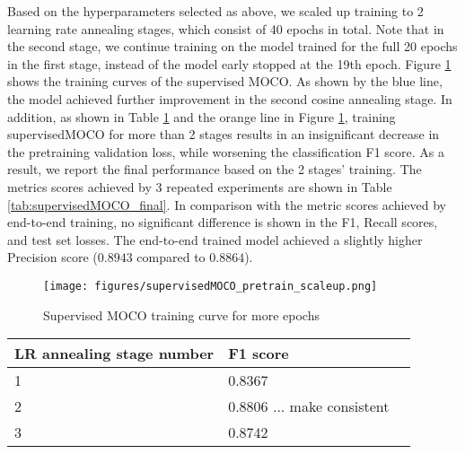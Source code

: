 \documentclass[12pt,twoside]{report}
\begin{document}
Based on the hyperparameters selected as above, we scaled up training to 2 learning rate annealing stages, which consist of 40 epochs in total. Note that in the second stage, we continue training on the model trained for the full 20 epochs in the first stage, instead of the model early stopped at the 19th epoch. Figure \ref{fig:supervisedMOCO_pretraining_final_curve} shows the training curves of the supervised MOCO. As shown by the blue line, the model achieved further improvement in the second cosine annealing stage. In addition, as shown in Table \ref{tab:supervisedMOCO_multistage} and the orange line in Figure \ref{fig:supervisedMOCO_pretraining_final_curve}, training supervisedMOCO for more than 2 stages results in an insignificant decrease in the pretraining validation loss, while worsening the classification F1 score. As a result, we report the final performance based on the 2 stages' training. The metrics scores achieved by 3 repeated experiments are shown in Table \ref{tab:supervisedMOCO_final}. In comparison with the metric scores achieved by end-to-end training, no significant difference is shown in the F1, Recall scores, and test set losses. The end-to-end trained model achieved a slightly higher Precision score ($0.8943$ compared to $0.8864$). \\

\begin{figure}
    \centering
    \texttt{[image: figures/supervisedMOCO\_pretrain\_scaleup.png]}
    \caption{Supervised MOCO training curve for more epochs}
    \label{fig:supervisedMOCO_pretraining_final_curve}
\end{figure}

\begin{table}[]
    \centering
    \begin{tabular}{lll}
    \toprule
    LR annealing stage number & F1 score \\
    \midrule
    1 & 0.8367 \\
    2 & 0.8806 ... make consistent\\
    3 & 0.8742 \\
    \bottomrule
    \end{tabular}
    \captionsetup{type=table}
    \label{tab:supervisedMOCO_multistage}
\end{table}
\end{document}
